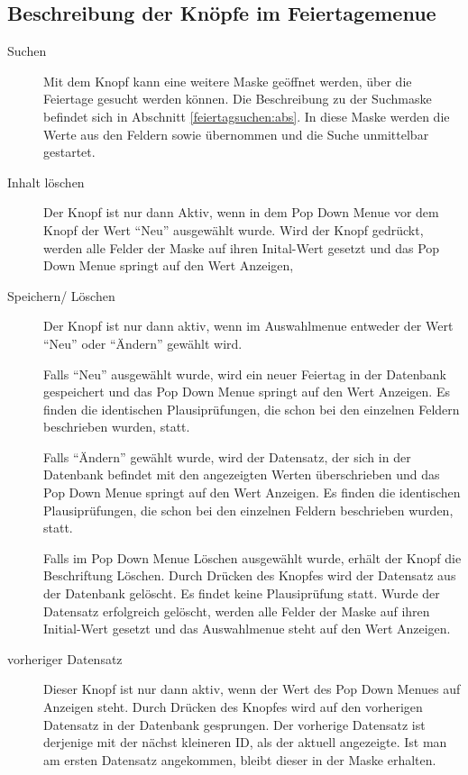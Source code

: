 \subsection{Beschreibung der Knöpfe im Feiertagemenue}
\begin{description}
\item[Suchen] Mit dem Knopf  kann eine weitere Maske geöffnet
werden, über die Feiertage gesucht werden können. Die Beschreibung zu der
Suchmaske befindet sich in Abschnitt \vref{feiertagsuchen:abs}.
In diese Maske werden die Werte aus den Feldern  sowie
 übernommen und die Suche unmittelbar gestartet.
\item[Inhalt löschen] Der Knopf  ist nur dann
Aktiv, wenn in dem
Pop Down Menue vor dem Knopf der Wert ``Neu'' ausgewählt wurde. Wird der Knopf
gedrückt, werden alle Felder der Maske auf ihren Inital-Wert gesetzt und das
Pop Down Menue springt auf den Wert Anzeigen,
\item[Speichern/ Löschen] Der Knopf  ist nur dann aktiv,
wenn im Auswahlmenue entweder der Wert ``Neu'' oder ``Ändern'' gewählt wird. 
\par
Falls ``Neu''
ausgewählt wurde, wird ein neuer Feiertag in der Datenbank gespeichert
und das Pop Down Menue springt auf den Wert Anzeigen. Es finden die
identischen Plausiprüfungen, die schon bei den einzelnen Feldern
beschrieben wurden, statt.
\par
Falls ``Ändern'' gewählt wurde, wird der Datensatz, der sich in der Datenbank
befindet mit den angezeigten Werten überschrieben und das Pop Down Menue
springt auf den Wert Anzeigen. 
Es finden die
identischen Plausiprüfungen, die schon bei den einzelnen Feldern
beschrieben wurden,
statt.\par
Falls im Pop Down Menue Löschen ausgewählt wurde, erhält der Knopf die
Beschriftung Löschen. Durch Drücken des Knopfes wird der Datensatz aus der
Datenbank gelöscht. Es findet keine Plausiprüfung statt.
Wurde der Datensatz erfolgreich gelöscht, werden
alle Felder der Maske auf ihren Initial-Wert gesetzt und das Auswahlmenue
steht auf den Wert Anzeigen.
\item[vorheriger Datensatz] Dieser Knopf ist nur dann aktiv, wenn der Wert
des Pop Down Menues auf Anzeigen steht. Durch Drücken des Knopfes wird auf
den vorherigen Datensatz in der Datenbank gesprungen. Der vorherige Datensatz
ist derjenige mit der nächst kleineren ID, als der aktuell angezeigte. Ist
man am ersten Datensatz angekommen, bleibt dieser in der Maske erhalten.

\end{description}
